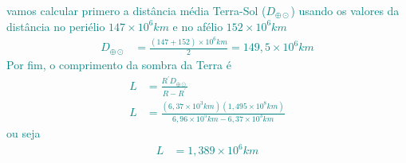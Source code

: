 \begin{sol}
	\textcolor{teal} {
		vamos calcular primero a distância média Terra-Sol ($D_{\oplus \odot }$) usando os valores da distância no periélio $147\times 10^{6}km$ e no afélio $152\times 10^{6}km$
		\begin{align}
			D_{\oplus \odot}&=\frac{\left(147+152\right)\times10^{6}km}{2}=149,5\times10^{6}km
		\end{align}
		Por fim, o comprimento da sombra da Terra é
		\begin{align}
			L&=\frac{R^{\prime}D_{\oplus \odot}}{R-R^{\prime}}\nonumber \\
			L&=\frac{\left(6,37\times10^{3}km\right)\left(1,495\times10^{8}km\right)}{6,96\times10^{5}km-6,37\times10^{3}km}
		\end{align}
		ou seja
		\begin{align}
			L&=1,389\times10^{6}km
		\end{align}
	}
\end{sol}